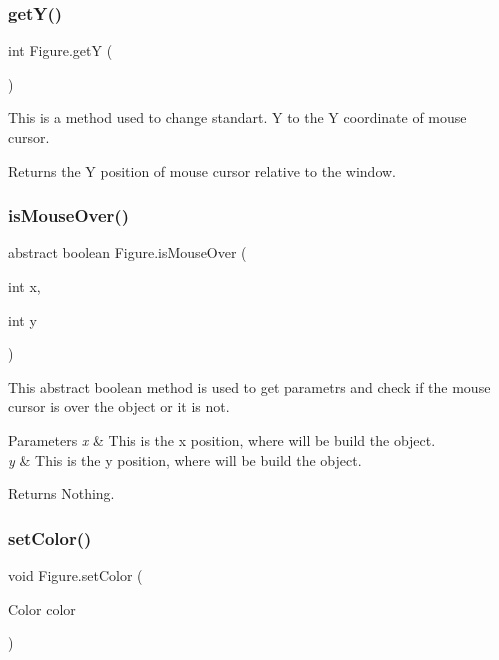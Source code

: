 \subsubsection{\texorpdfstring{getY()}{getY()}}
{\footnotesize\ttfamily int Figure.\+getY (\begin{DoxyParamCaption}{ }\end{DoxyParamCaption})}

This is a method used to change standart. Y to the Y coordinate of mouse cursor. \begin{DoxyReturn}{Returns}
the Y position of mouse cursor relative to the window. 
\end{DoxyReturn}
\mbox{\label{class_figure_adeb77ba46e22fad8a9bc86c10ac62221}} 
\subsubsection{\texorpdfstring{isMouseOver()}{isMouseOver()}}
{\footnotesize\ttfamily abstract boolean Figure.\+is\+Mouse\+Over (\begin{DoxyParamCaption}\item[{int}]{x,  }\item[{int}]{y }\end{DoxyParamCaption})\hspace{0.3cm}{\ttfamily [abstract]}}

This abstract boolean method is used to get parametrs and check if the mouse cursor is over the object or it is not. 
\begin{DoxyParams}{Parameters}
{\em x} & This is the x position, where will be build the object. \\
\hline
{\em y} & This is the y position, where will be build the object. \\
\hline
\end{DoxyParams}
\begin{DoxyReturn}{Returns}
Nothing. 
\end{DoxyReturn}
\mbox{\label{class_figure_aa4f43d4c640d16823dc2b451fbc92020}} 
\subsubsection{\texorpdfstring{setColor()}{setColor()}}
{\footnotesize\ttfamily void Figure.\+set\+Color (\begin{DoxyParamCaption}\item[{Color}]{color }\end{DoxyParamCaption})}


